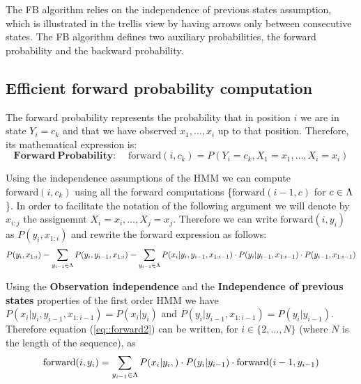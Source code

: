 The FB algorithm relies on the independence of previous states
assumption, which  
is illustrated in the trellis view by having arrows only between consecutive states. 
The FB algorithm defines two auxiliary probabilities, the forward probability and the backward probability. 

\subsection*{Efficient forward probability computation}
The forward probability represents the probability that in position
$i$ we are in state $Y_i = c_k$ and that we have observed $x_1,\ldots,x_i$
up to that position. Therefore, its mathematical expression is:
\begin{equation}
\label{eq::forward}
\mathbf{Forward \ Probability\!:}\;\;\;\;  \mathrm{forward}(i, c_k) = P(Y_i = c_k, X_1=x_1,\ldots, X_i = x_i)
\end{equation}

Using the independence assumptions of the HMM we can compute $\mathrm{forward}(i, c_k)$ using all the forward computations \{$\mathrm{forward}(i -1, c)$ for $c \in \Lambda$\}. In order to facilitate the notation of the following argument we will denote by $x_{i:j}$  the assignemnt $X_i = x_i, \dots, X_j = x_j$. Therefore we can write   $\mathrm{forward}(i, y_i) $ as $P( y_i, x_{1:i } ) $ and rewrite the forward expression as follows:
\begin{equation}
\label{eq::forward2}
  P( y_i, x_{1:i } ) =  \sum_{y_{i-1} \in \Lambda} P( y_i ,y_{i-1}, x_{1:i } )  =  \sum_{y_{i-1} \in \Lambda} P( x_i  | y_i,  y_{i-1},  x_{1:i-1 } ) \cdot P(y_i  | y_{i-1},  x_{1:i-1 }) \cdot P(y_{i-1},  x_{1:i-1 })  
\end{equation}

Using the \textbf{Observation independence} and the \textbf{Independence of previous states} properties of the first order HMM we have $P( x_i  | y_i,  y_{i-1},  x_{1:i-1 } ) = P( x_i  | y_i) $ and $P(y_i  | y_{i-1},  x_{1:i-1 })  = P(y_i  | y_{i-1})  $. Therefore equation (\ref{eq::forward2}) can be written, 
for $i \in \{2,\dots,N\}$ (where $N$ is the length of the sequence), as 
\begin{equation}
\label{eq::forward3}
 \mathrm{forward}(i, y_i)  = \sum_{y_{i-1} \in \Lambda} P( x_i  | y_i, ) \cdot P(y_i  | y_{i-1}) \cdot \mathrm{forward}(i-1, y_{i-1})   
\end{equation}

